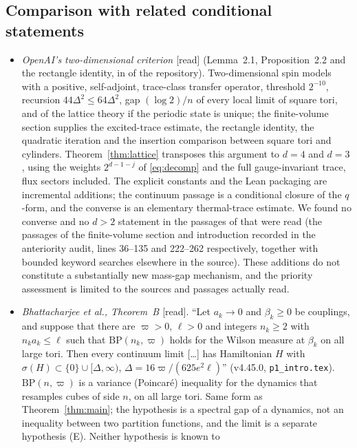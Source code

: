 \documentclass[11pt,a4paper]{article}
\theoremstyle{plain}
\theoremstyle{definition}
\theoremstyle{remark}
\numberwithin{equation}{section}
\newcommand{\st}[1]{\textsf{[#1]}}
\begin{document}
\subsection{Comparison with related conditional statements}\label{sec:compare}
\begin{itemize}
\item \emph{OpenAI's two-dimensional criterion \cite{OAI26}} \st{read} (Lemma~2.1, Proposition~2.2 and the rectangle identity, in
 of the repository). Two-dimensional spin models with a positive, self-adjoint, trace-class transfer operator,
threshold $2^{-10}$, recursion $44\Delta^2\le64\Delta^2$, gap $(\log2)/n$ of every local limit of square tori, and of the lattice theory if the
periodic state is unique; the finite-volume section supplies the excited-trace estimate, the rectangle identity, the quadratic iteration and
the insertion comparison between square tori and cylinders. Theorem~\ref{thm:lattice} transposes this argument to $d=4$ and $d=3$, using the
weights $2^{d-1-j}$ of \eqref{eq:decomp} and the full gauge-invariant trace, flux sectors included. The explicit constants and the Lean packaging
are incremental additions; the continuum passage is a conditional closure of the $q$-form, and the converse is an elementary thermal-trace
estimate. We found no converse and no $d>2$ statement in the passages of \cite{OAI26} that were read (the passages of the finite-volume section and introduction recorded in the anteriority audit, lines 36--135 and 222--262 respectively, together with bounded keyword searches elsewhere in the source).
These additions do not constitute a substantially new mass-gap mechanism, and the priority assessment is limited to the sources and passages
actually read.
\item \emph{Bhattacharjee et al., Theorem~B \cite{BB26}} \st{read}. ``Let $a_k\to0$ and $\beta_k\ge0$ be couplings, and suppose that there
are $\varpi>0$, $\ell>0$ and integers $n_k\ge2$ with $n_ka_k\le\ell$ such that $\mathrm{BP}(n_k,\varpi)$ holds for the Wilson measure at
$\beta_k$ on all large tori. Then every continuum limit [\dots] has Hamiltonian $H$ with $\sigma(H)\subset\{0\}\cup[\Delta,\infty)$,
$\Delta=16\varpi/(625e^2\ell)$'' (v4.45.0, \texttt{p1\_intro.tex}). $\mathrm{BP}(n,\varpi)$ is a variance (Poincar\'e) inequality for the
dynamics that resamples cubes of side $n$, on all large tori. Same form as Theorem~\ref{thm:main}; the hypothesis is a spectral gap of a
dynamics, not an inequality between two partition functions, and the limit is a separate hypothesis (E). Neither hypothesis is known to

\end{itemize}
\end{document}
